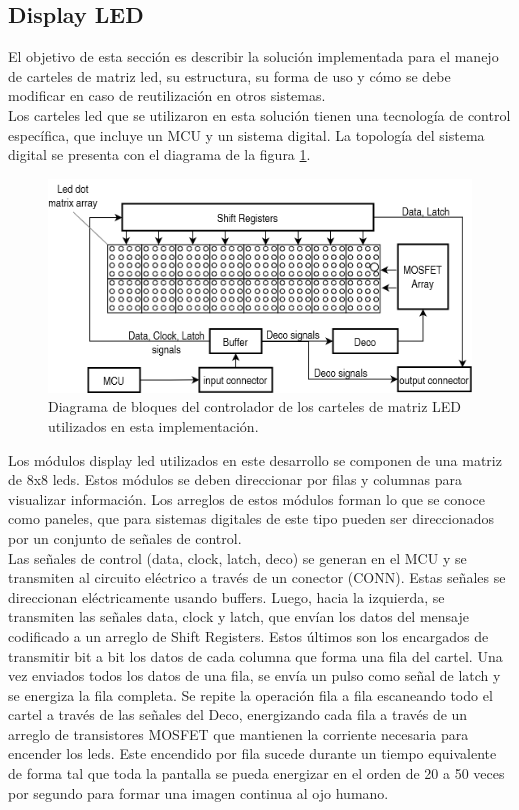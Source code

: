 \subsection{Display LED}

El objetivo de esta sección es describir la solución implementada para el manejo de carteles de matriz led, su estructura, su forma de uso y cómo se debe modificar en caso de reutilización en otros sistemas.\\

Los carteles led que se utilizaron en esta solución tienen una tecnología de control específica, que incluye un MCU y un sistema digital. La topología del sistema digital se presenta con el diagrama de la figura \ref{fig:diagDriverLED}.\\

\begin{figure}[ht]
	\centering
	\includegraphics[]{./Figures/diagDriverLED.png}
	\caption{Diagrama de bloques del controlador de los carteles de matriz LED utilizados en esta implementación.}
	\label{fig:diagDriverLED}
\end{figure}

Los módulos display led utilizados en este desarrollo se componen de una matriz de 8x8 leds. Estos módulos se deben direccionar por filas y columnas para  visualizar información. Los arreglos de estos módulos forman lo que se conoce como paneles, que para sistemas digitales de este tipo pueden ser direccionados por un conjunto de señales de control.\\

Las señales de control (data, clock, latch, deco) se generan en el MCU y se transmiten al circuito eléctrico a través de un conector (CONN). Estas señales se direccionan eléctricamente usando buffers. Luego, hacia la izquierda, se transmiten las señales data, clock y latch, que envían los datos del mensaje codificado a un arreglo de Shift Registers. Estos últimos son los encargados de transmitir bit a bit los datos de cada columna que forma una fila del cartel. Una vez enviados todos los datos de una fila, se envía un pulso como señal de latch y se energiza la fila completa. Se repite la operación fila a fila escaneando todo el cartel a través de las señales del Deco, energizando cada fila a través de un arreglo de transistores MOSFET que mantienen la corriente necesaria para encender los leds. Este encendido por fila sucede durante un tiempo equivalente de forma tal que toda la pantalla se pueda energizar en el orden de 20 a 50 veces por segundo para formar una imagen continua al ojo humano.\\

